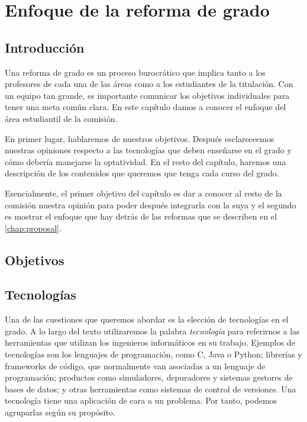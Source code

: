 \chapter{Enfoque de la reforma de grado}\label{chap:approach}

\section{Introducción}


Una reforma de grado es un proceso burocrático que implica tanto a los
profesores de cada una de las áreas como a los estudiantes de la titulación.
Con un equipo tan grande,
es importante comunicar los objetivos individuales para
tener una meta común clara.
En este capítulo damos a conocer el enfoque del área estudiantil de la comisión.


En primer lugar, hablaremos de nuestros objetivos.
Después esclareceemos nuestras opiniones respecto a
las tecnologías que deben enseñarse en el grado y
cómo debería manejarse la optatividad.
En el resto del capítulo,
haremos una descripción de
los contenidos que queremos que tenga cada curso del grado.


Esencialmente, el primer objetivo del capítulo es
dar a conocer al resto de la comisión nuestra opinión
para poder después integrarla con la suya y
el segundo es mostrar el enfoque que
hay detrás de las reformas que se describen en el \cref{chap:proposal}.

\section{Objetivos}

\section{Tecnologías}

Una de las cuestiones que queremos abordar es
la elección de tecnologías en el grado.
A lo largo del texto utilizaremos la palabra \emph{tecnología} para referirnos a
las herramientas que utilizan los ingenieros informáticos en su trabajo.
Ejemplos de tecnologías son
los lenguajes de programación,
como C, Java o Python;
librerías y frameworks de código,
que normalmente van asociadas a un lenguaje de programación;
productos como simuladores, depuradores y sistemas gestores de bases de datos; y
otras herramientas como sistemas de control de versiones.
Una tecnología tiene una aplicación de cara a un problema.
Por tanto, podemos agruparlas según su propósito.

